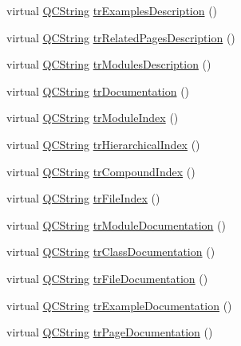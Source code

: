 \begin{DoxyCompactItemize}
virtual \mbox{\hyperlink{class_q_c_string}{Q\+C\+String}} \mbox{\hyperlink{class_translator_japanese_a64634d888eea387e1678d0c7fbd7e510}{tr\+Examples\+Description}} ()
\item 
virtual \mbox{\hyperlink{class_q_c_string}{Q\+C\+String}} \mbox{\hyperlink{class_translator_japanese_adf7b56555d2ab0c6a0263cdf785ce3f3}{tr\+Related\+Pages\+Description}} ()
\item 
virtual \mbox{\hyperlink{class_q_c_string}{Q\+C\+String}} \mbox{\hyperlink{class_translator_japanese_a055f2850d4543ca3bde12af63114ac78}{tr\+Modules\+Description}} ()
\item 
virtual \mbox{\hyperlink{class_q_c_string}{Q\+C\+String}} \mbox{\hyperlink{class_translator_japanese_abd15dfd03f03cf0b753eeedb43a3b7eb}{tr\+Documentation}} ()
\item 
virtual \mbox{\hyperlink{class_q_c_string}{Q\+C\+String}} \mbox{\hyperlink{class_translator_japanese_afc8dced41f60d8ae454847f48c7fc471}{tr\+Module\+Index}} ()
\item 
virtual \mbox{\hyperlink{class_q_c_string}{Q\+C\+String}} \mbox{\hyperlink{class_translator_japanese_ad3a716af39b29fc11c01c8f0f151fe17}{tr\+Hierarchical\+Index}} ()
\item 
virtual \mbox{\hyperlink{class_q_c_string}{Q\+C\+String}} \mbox{\hyperlink{class_translator_japanese_a8c73341c674393f0eee9ce844e4d3e77}{tr\+Compound\+Index}} ()
\item 
virtual \mbox{\hyperlink{class_q_c_string}{Q\+C\+String}} \mbox{\hyperlink{class_translator_japanese_a744e9944d8d0ba02c581a720fe5e3ea3}{tr\+File\+Index}} ()
\item 
virtual \mbox{\hyperlink{class_q_c_string}{Q\+C\+String}} \mbox{\hyperlink{class_translator_japanese_a4a84703619c7fbf08d815a7e1ed5051b}{tr\+Module\+Documentation}} ()
\item 
virtual \mbox{\hyperlink{class_q_c_string}{Q\+C\+String}} \mbox{\hyperlink{class_translator_japanese_ae30321cdfb2130dcd973ce5b4bb3d42e}{tr\+Class\+Documentation}} ()
\item 
virtual \mbox{\hyperlink{class_q_c_string}{Q\+C\+String}} \mbox{\hyperlink{class_translator_japanese_aaae4a8fe9bc640dba47fc68934e5d04e}{tr\+File\+Documentation}} ()
\item 
virtual \mbox{\hyperlink{class_q_c_string}{Q\+C\+String}} \mbox{\hyperlink{class_translator_japanese_af9f10fc778f95f99edd3dec625eb66ae}{tr\+Example\+Documentation}} ()
\item 
virtual \mbox{\hyperlink{class_q_c_string}{Q\+C\+String}} \mbox{\hyperlink{class_translator_japanese_ab0a8b5e01ab4ffdc74dc646f62d3b5d6}{tr\+Page\+Documentation}} ()

\end{DoxyCompactItemize}
